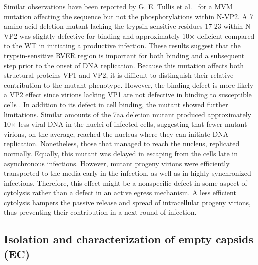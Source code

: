 Similar observations have been reported by G. E. Tullis et al.~\cite{pmid1448928} for a MVM mutation affecting the sequence but not the phosphorylations within N-VP2. A 7 amino acid deletion mutant lacking the trypsin-sensitive residues 17-23 within N-VP2 was slightly defective for binding and approximately 10$\times$ deficient compared to the WT in initiating a productive infection. These results suggest that the trypsin-sensitive RVER region is important for both binding and a subsequent step prior to the onset of DNA replication. Because this mutation affects both structural proteins VP1 and VP2, it is difficult to distinguish their relative contribution to the mutant phenotype. However, the binding defect is more likely a VP2 effect since virions lacking VP1 are not defective in binding to susceptible cells \cite{pmid8416366}. In addition to its defect in cell binding, the mutant showed further limitations. Similar amounts of the 7aa deletion mutant produced approximately 10$\times$ less viral DNA in the nuclei of infected cells, suggesting that fewer mutant virions, on the average, reached the nucleus where they can initiate DNA replication. Nonetheless, those that managed to reach the nucleus, replicated normally. Equally, this mutant was delayed in escaping from the cells late in asynchronous infections. However, mutant progeny virions were efficiently transported to the media early in the infection, as well as in highly synchronized infections. Therefore, this effect might be a nonspecific defect in some aspect of cytolysis rather than a defect in an active egress mechanism. A less efficient cytolysis hampers the passive release and spread of intracellular progeny virions, thus preventing their contribution in a next round of infection. 




\subsection{Isolation and characterization of empty capsids (EC)}

